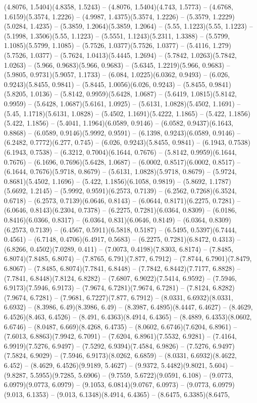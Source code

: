 (4.8076, 1.5404)(4.8358, 1.5243) -- (4.8076, 1.5404)(4.743, 1.5773) -- (4.6768, 1.6159)(5.3574, 1.2226) -- (4.9987, 1.4375)(5.3574, 1.2226) -- (5.3579, 1.2229)(5.0284, 1.4235) -- (5.3859, 1.2064)(5.3859, 1.2064) -- (5.55, 1.1223)(5.55, 1.1223) -- (5.1998, 1.3506)(5.55, 1.1223) -- (5.5551, 1.1243)(5.2311, 1.3388) -- (5.5799, 1.1085)(5.5799, 1.1085) -- (5.7526, 1.0377)(5.7526, 1.0377) -- (5.4116, 1.279)(5.7526, 1.0377) -- (5.7624, 1.0413)(5.4445, 1.2694) -- (5.7842, 1.0263)(5.7842, 1.0263) -- (5.966, 0.9683)(5.966, 0.9683) -- (5.6345, 1.2219)(5.966, 0.9683) -- (5.9805, 0.9731)(5.9057, 1.1733) -- (6.084, 1.0225)(6.0362, 0.9493) -- (6.026, 0.9243)(5.8455, 0.9841) -- (5.8445, 1.0056)(6.026, 0.9243) -- (5.8455, 0.9841)(5.8205, 1.0136) -- (5.8142, 0.9959)(5.6428, 1.0687) -- (5.6419, 1.0815)(5.8142, 0.9959) -- (5.6428, 1.0687)(5.6161, 1.0925) -- (5.6131, 1.0828)(5.4502, 1.1691) -- (5.45, 1.1718)(5.6131, 1.0828) -- (5.4502, 1.1691)(5.4222, 1.1865) -- (5.422, 1.1856)(5.422, 1.1856) -- (5.4041, 1.1964)(6.0589, 0.9146) -- (6.0582, 0.9437)(6.1643, 0.8868) -- (6.0589, 0.9146)(5.9992, 0.9591) -- (6.1398, 0.9243)(6.0589, 0.9146) -- (6.2482, 0.7772)(6.277, 0.745) -- (6.026, 0.9243)(5.8455, 0.9841) -- (6.1943, 0.7538)(6.1943, 0.7538) -- (6.3212, 0.7004)(6.1644, 0.7676) -- (5.8142, 0.9959)(6.1644, 0.7676) -- (6.1696, 0.7696)(5.6428, 1.0687) -- (6.0002, 0.8517)(6.0002, 0.8517) -- (6.1644, 0.7676)(5.9718, 0.8679) -- (5.6131, 1.0828)(5.9718, 0.8679) -- (5.9724, 0.8681)(5.4502, 1.1696) -- (5.422, 1.1856)(6.1058, 0.9819) -- (5.8692, 1.1787)(5.6692, 1.2145) -- (5.9992, 0.9591)(6.2573, 0.7139) -- (6.2562, 0.7268)(6.3524, 0.6718) -- (6.2573, 0.7139)(6.0646, 0.8143) -- (6.0644, 0.8171)(6.2275, 0.7281) -- (6.0646, 0.8143)(6.2304, 0.7378) -- (6.2275, 0.7281)(6.0364, 0.8309) -- (6.0186, 0.8416)(6.0366, 0.8317) -- (6.0364, 0.831)(6.0646, 0.8149) -- (6.0364, 0.8309)(6.2573, 0.7139) -- (6.4567, 0.5911)(6.5818, 0.5187) -- (6.5495, 0.5397)(6.7444, 0.4561) -- (6.7148, 0.4706)(6.4917, 0.5683) -- (6.2275, 0.7281)(6.8472, 0.4313) -- (6.8266, 0.4502)(7.0289, 0.411) -- (7.0073, 0.4198)(7.8303, 6.8174) -- (7.8485, 6.8074)(7.8485, 6.8074) -- (7.8765, 6.791)(7.877, 6.7912) -- (7.8744, 6.7901)(7.8479, 6.8067) -- (7.8485, 6.8074)(7.7841, 6.8448) -- (7.7842, 6.8442)(7.7177, 6.8828) -- (7.7841, 6.8448)(7.8124, 6.8282) -- (7.6807, 6.9022)(7.5414, 6.9592) -- (7.5946, 6.9173)(7.5946, 6.9173) -- (7.9674, 6.7281)(7.9674, 6.7281) -- (7.8124, 6.8282)(7.9674, 6.7281) -- (7.9681, 6.7227)(7.877, 6.7912) -- (8.0331, 6.6932)(8.0331, 6.6932) -- (8.3986, 6.49)(8.3986, 6.49) -- (8.3987, 6.4895)(8.4447, 6.4627) -- (8.4629, 6.4526)(8.463, 6.4526) -- (8.491, 6.4363)(8.4914, 6.4365) -- (8.4889, 6.4353)(8.0602, 6.6746) -- (8.0487, 6.669)(8.4268, 6.4735) -- (8.0602, 6.6746)(7.6204, 6.8961) -- (7.6013, 6.8863)(7.9942, 6.7091) -- (7.6204, 6.8961)(7.5532, 6.9281) -- (7.4164, 6.9919)(7.5276, 6.9497) -- (7.5292, 6.9394)(7.4584, 6.9826) -- (7.5276, 6.9497)(7.5824, 6.9029) -- (7.5946, 6.9173)(8.0262, 6.6859) -- (8.0331, 6.6932)(8.4622, 6.452) -- (8.4629, 6.4526)(9.9189, 5.4627) -- (9.9372, 5.4482)(9.8021, 5.604) -- (9.8287, 5.5955)(9.7285, 5.6906) -- (9.7559, 5.6722)(9.0591, 6.108) -- (9.0773, 6.0979)(9.0773, 6.0979) -- (9.1053, 6.0814)(9.0767, 6.0973) -- (9.0773, 6.0979)(9.013, 6.1353) -- (9.013, 6.1348)(8.4914, 6.4365) -- (8.6475, 6.3385)(8.6475, 